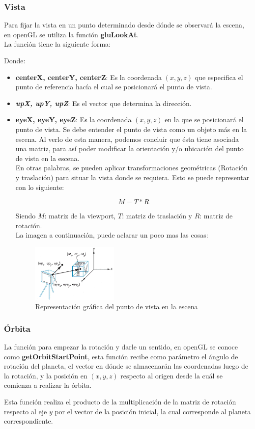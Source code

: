 \documentclass[12pt,journal,compsoc]{IEEEtran}
\begin{document}
\subsubsection{Vista}
Para fijar la vista en un punto determinado desde dónde se observará la escena, en openGL se utiliza la función \textbf{gluLookAt}. \\La función tiene la siguiente forma:
%

%
Donde:
%
\begin{itemize}
	\item \textbf{centerX, centerY, centerZ}: Es la coordenada $(x,y,z)$ que especifica el punto de referencia hacía el cual se posicionará el punto de vista.
	\item \textbf{\textit{upX, upY, upZ}}: Es el vector que determina la dirección.
	\item \textbf{eyeX, eyeY, eyeZ}: Es la coordenada $(x,y,z)$ en la que se posicionará el punto de vista.
%
Se debe entender el punto de vista como un objeto más en la escena. Al verlo de esta manera, podemos concluir que ésta tiene asociada una matriz, para así poder modificar la orientación y/o ubicación del punto de vista en la escena.\\
En otras palabras, se pueden aplicar transformaciones geométricas (Rotación y traslación)  para situar la  vista donde se requiera. Esto se puede representar con lo siguiente:

\[
	M = T * R
\]

Siendo $M$: matriz de la viewport, $T$: matriz de traslación y $R$: matriz de rotación.\\La imagen a continuación, puede aclarar un poco mas las cosas:

\begin{figure}[h!]
	\includegraphics[width=0.4\textwidth, height=0.25\textwidth]{viewport.png}
	\centering
	\caption{Representación gráfica del punto de vista en la escena}
\end{figure}
%
\end{itemize}
\subsubsection{Órbita}
La función para empezar la rotación y darle un sentido, en openGL se conoce como \textbf{getOrbitStartPoint}, esta función recibe como parámetro el ángulo de rotación del planeta, el vector en dónde se almacenarán las coordenadas luego de la rotación, y la posición en $(x,y,z)$ respecto al origen desde la cuál se comienza a realizar la órbita.
%

%
Esta función realiza el producto de la multiplicación de la matriz de rotación respecto al eje $y$ por el vector de la posición inicial, la cual corresponde al planeta correspondiente.
\end{document}
